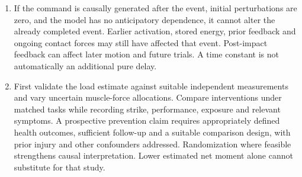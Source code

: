 \begin{enumerate}[leftmargin=*]
\item If the command is causally generated after the event, initial perturbations are zero, and the model has no anticipatory dependence, it cannot alter the already completed event. Earlier activation, stored energy, prior feedback and ongoing contact forces may still have affected that event. Post-impact feedback can affect later motion and future trials. A time constant is not automatically an additional pure delay.
\item First validate the load estimate against suitable independent measurements and vary uncertain muscle-force allocations. Compare interventions under matched tasks while recording strike, performance, exposure and relevant symptoms. A prospective prevention claim requires appropriately defined health outcomes, sufficient follow-up and a suitable comparison design, with prior injury and other confounders addressed. Randomization where feasible strengthens causal interpretation. Lower estimated net moment alone cannot substitute for that study.
\end{enumerate}

\cleardoublepage
